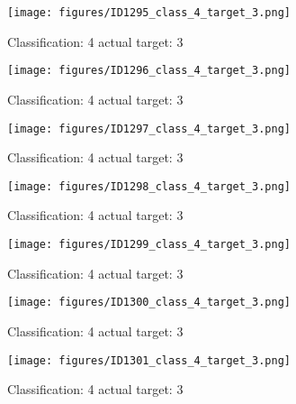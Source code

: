 \begin{figure}[h!]
\begin{center}
\texttt{[image: figures/ID1295\_class\_4\_target\_3.png]}
\end{center}
\caption{ Classification: 4 actual target: 3}
\label{fig:ID1295_class_4_target_3}
\end{figure}
\begin{figure}[h!]
\begin{center}
\texttt{[image: figures/ID1296\_class\_4\_target\_3.png]}
\end{center}
\caption{ Classification: 4 actual target: 3}
\label{fig:ID1296_class_4_target_3}
\end{figure}
\begin{figure}[h!]
\begin{center}
\texttt{[image: figures/ID1297\_class\_4\_target\_3.png]}
\end{center}
\caption{ Classification: 4 actual target: 3}
\label{fig:ID1297_class_4_target_3}
\end{figure}
\begin{figure}[h!]
\begin{center}
\texttt{[image: figures/ID1298\_class\_4\_target\_3.png]}
\end{center}
\caption{ Classification: 4 actual target: 3}
\label{fig:ID1298_class_4_target_3}
\end{figure}
\begin{figure}[h!]
\begin{center}
\texttt{[image: figures/ID1299\_class\_4\_target\_3.png]}
\end{center}
\caption{ Classification: 4 actual target: 3}
\label{fig:ID1299_class_4_target_3}
\end{figure}
\begin{figure}[h!]
\begin{center}
\texttt{[image: figures/ID1300\_class\_4\_target\_3.png]}
\end{center}
\caption{ Classification: 4 actual target: 3}
\label{fig:ID1300_class_4_target_3}
\end{figure}
\begin{figure}[h!]
\begin{center}
\texttt{[image: figures/ID1301\_class\_4\_target\_3.png]}
\end{center}
\caption{ Classification: 4 actual target: 3}
\label{fig:ID1301_class_4_target_3}
\end{figure}
